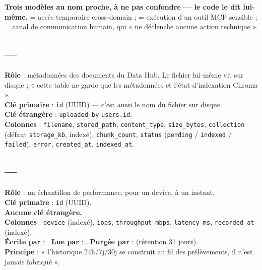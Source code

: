 \begin{infobox}
\textbf{Trois modèles au nom proche, à ne pas confondre --- le code le dit
lui-même.}  = accès temporaire cross-domain ;
 = exécution d'un outil MCP sensible ;
 = canal de communication humain, qui « ne déclenche aucune
action technique ».
\end{infobox}

\subsection{ --- }

\textbf{Rôle} : métadonnées des documents du Data Hub. Le fichier lui-même vit
sur disque ; « cette table ne garde que les métadonnées et l'état d'indexation
Chroma ».\\
\textbf{Clé primaire} : \texttt{id} (UUID) --- c'est aussi le nom du fichier sur
disque.\\
\textbf{Clé étrangère} : \texttt{uploaded\_by} \arrowto{} \texttt{users.id}.\\
\textbf{Colonnes} : \texttt{filename}, \texttt{stored\_path},
\texttt{content\_type}, \texttt{size\_bytes}, \texttt{collection} (défaut
\texttt{storage\_kb}, indexé), \texttt{chunk\_count}, \texttt{status}
(\texttt{pending} / \texttt{indexed} / \texttt{failed}), \texttt{error},
\texttt{created\_at}, \texttt{indexed\_at}.

\subsection{ --- }

\textbf{Rôle} : un échantillon de performance, pour un device, à un instant.\\
\textbf{Clé primaire} : \texttt{id} (UUID).\\
\textbf{Aucune clé étrangère.}\\
\textbf{Colonnes} : \texttt{device} (indexé), \texttt{iops},
\texttt{throughput\_mbps}, \texttt{latency\_ms}, \texttt{recorded\_at} (indexé).\\
\textbf{Écrite par} : .
\textbf{Lue par} : . \textbf{Purgée par} : 
(rétention 31 jours).\\
\textbf{Principe} : « l'historique 24h/7j/30j se construit au fil des
prélèvements, il n'est jamais fabriqué ».

